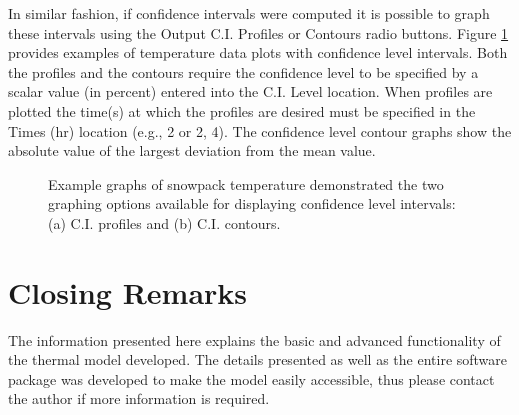 In similar fashion, if confidence intervals were computed it is possible to graph these intervals using the Output C.I. Profiles or Contours radio buttons.  Figure \ref{TM:fig:ciexample} provides examples of temperature data plots with confidence level intervals.  Both the profiles and the contours require the confidence level to be specified by a scalar value (in percent) entered into the C.I. Level location.  When profiles are plotted the time(s) at which the profiles are desired must be specified in the Times (hr) location (e.g., 2 or 2, 4).  The confidence level contour graphs show the absolute value of the largest deviation from the mean value.

\begin{figure}[ht!]\centering
{}\quad
{}\quad
\caption{Example graphs of snowpack temperature demonstrated the two graphing options available for displaying confidence level intervals: (a) C.I. profiles and (b) C.I. contours.}
\label{TM:fig:ciexample}
\end{figure}

\section{Closing Remarks}
The information presented here explains the basic and advanced functionality of the thermal model developed. The details presented as well as the entire software package was developed to make the model easily accessible, thus please contact the author if more information is required.

